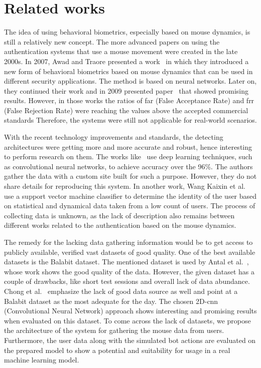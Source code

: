 \section{Related works}\label{sec:related-works}
The idea of using behavioral biometrics, especially based on mouse dynamics, is still a relatively new concept.
The more advanced papers on using the authentication systems that use a mouse movement were created in the late 2000s.
In 2007, Awad and Traore presented a work~\cite{firstMouseBBPapers1} in which they introduced a new form of behavioral biometrics based on mouse dynamics that can be used in different security applications.
The method is based on neural networks.
Later on, they continued their work and in 2009 presented paper~\cite{wang2009behavioral} that showed promising results.
However, in those works the ratios of \gls{far} (False Acceptance Rate) and \gls{frr} (False Rejection Rate) were reaching the values above the accepted commercial standards
Therefore, the systems were still not applicable for real-world scenarios.

With the recent technology improvements and standards, the detecting architectures were getting more and more accurate and robust, hence interesting to perform research on them.
The works like~\cite{a-deep-learning-approach-to-web-bot-detection-using-mouse-behavioral-biometrics} use deep learning techniques, such as convolutional neural networks, to achieve accuracy over the 96\%.
The authors gather the data with a custom site built for such a purpose.
However, they do not share details for reproducing this system.
In another work, Wang Kaixin et al.~\cite{a-user-authentication-and-identification-model-based-on-mouse-dynamics} use a support vector machine classifier to determine the identity of the user based on statistical and dynamical data taken from a low count of users.
The process of collecting data is unknown, as the lack of description also remains between different works related to the authentication based on the mouse dynamics.

The remedy for the lacking data gathering information would be to get access to publicly available, verified vast datasets of good quality.
One of the best available datasets is the Balabit dataset.
The mentioned dataset is used by Antal et al.~\cite{antal2019intrusion}, whose work shows the good quality of the data.
However, the given dataset has a couple of drawbacks, like short test sessions and overall lack of data abundance.
Chong et al.~\cite{Main} emphasize the lack of good data source as well and point at a Balabit dataset as the most adequate for the day.
The chosen 2D-\gls{cnn} (Convolutional Neural Network) approach shows interesting and promising results when evaluated on this dataset.
To come across the lack of datasets, we propose the architecture of the system for gathering the mouse data from users.
Furthermore, the user data along with the simulated bot actions are evaluated on the prepared model to show a potential and suitability for usage in a real machine learning model.
